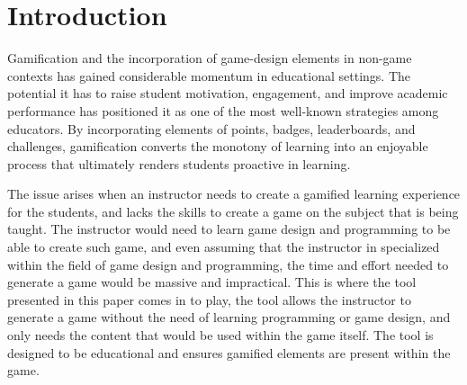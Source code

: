 \chapter{Introduction}\label{chap:intro}

Gamification and the incorporation of game-design elements in non-game contexts has gained considerable momentum in educational settings. The potential it has to raise student motivation, engagement, and improve academic performance has positioned it as one of the most well-known strategies among educators. By incorporating elements of points, badges, leaderboards, and challenges, gamification converts the monotony of learning into an enjoyable process that ultimately renders students proactive in learning.

The issue arises when an instructor needs to create a gamified learning experience for the students, and lacks the skills to create a game on the subject that is being taught. The instructor would need to learn game design and programming to be able to create such game, and even assuming that the instructor in specialized within the field of game design and programming, the time and effort needed to generate a game would be massive and impractical. This is where the tool presented in this paper comes in to play, the tool allows the instructor to generate a game without the need of learning programming or game design, and only needs the content that would be used within the game itself. The tool is designed to be educational and ensures gamified elements are present within the game. 

